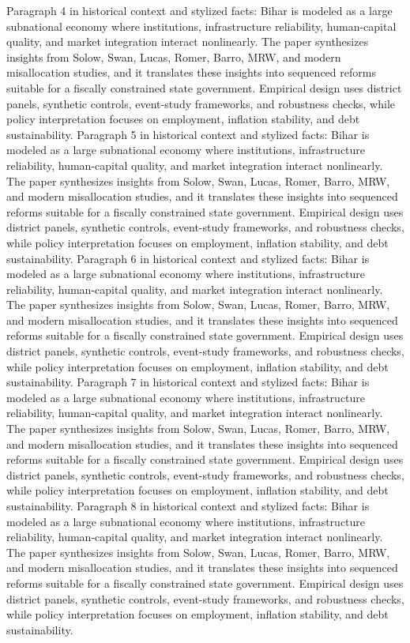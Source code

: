 \documentclass[preprint,12pt]{elsarticle}
\begin{document}
Paragraph 4 in historical context and stylized facts: Bihar is modeled as a large subnational economy where institutions, infrastructure reliability, human-capital quality, and market integration interact nonlinearly. The paper synthesizes insights from Solow, Swan, Lucas, Romer, Barro, MRW, and modern misallocation studies, and it translates these insights into sequenced reforms suitable for a fiscally constrained state government. Empirical design uses district panels, synthetic controls, event-study frameworks, and robustness checks, while policy interpretation focuses on employment, inflation stability, and debt sustainability.
Paragraph 5 in historical context and stylized facts: Bihar is modeled as a large subnational economy where institutions, infrastructure reliability, human-capital quality, and market integration interact nonlinearly. The paper synthesizes insights from Solow, Swan, Lucas, Romer, Barro, MRW, and modern misallocation studies, and it translates these insights into sequenced reforms suitable for a fiscally constrained state government. Empirical design uses district panels, synthetic controls, event-study frameworks, and robustness checks, while policy interpretation focuses on employment, inflation stability, and debt sustainability.
Paragraph 6 in historical context and stylized facts: Bihar is modeled as a large subnational economy where institutions, infrastructure reliability, human-capital quality, and market integration interact nonlinearly. The paper synthesizes insights from Solow, Swan, Lucas, Romer, Barro, MRW, and modern misallocation studies, and it translates these insights into sequenced reforms suitable for a fiscally constrained state government. Empirical design uses district panels, synthetic controls, event-study frameworks, and robustness checks, while policy interpretation focuses on employment, inflation stability, and debt sustainability.
Paragraph 7 in historical context and stylized facts: Bihar is modeled as a large subnational economy where institutions, infrastructure reliability, human-capital quality, and market integration interact nonlinearly. The paper synthesizes insights from Solow, Swan, Lucas, Romer, Barro, MRW, and modern misallocation studies, and it translates these insights into sequenced reforms suitable for a fiscally constrained state government. Empirical design uses district panels, synthetic controls, event-study frameworks, and robustness checks, while policy interpretation focuses on employment, inflation stability, and debt sustainability.
Paragraph 8 in historical context and stylized facts: Bihar is modeled as a large subnational economy where institutions, infrastructure reliability, human-capital quality, and market integration interact nonlinearly. The paper synthesizes insights from Solow, Swan, Lucas, Romer, Barro, MRW, and modern misallocation studies, and it translates these insights into sequenced reforms suitable for a fiscally constrained state government. Empirical design uses district panels, synthetic controls, event-study frameworks, and robustness checks, while policy interpretation focuses on employment, inflation stability, and debt sustainability.
\end{document}
